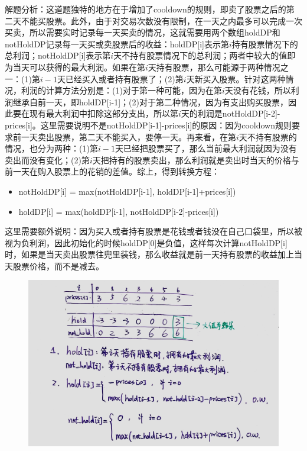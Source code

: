 \documentclass[a4paper,10pt]{article}
\begin{document}
\begin{CJK*}{UTF8}{gbsn}
\noindent 解题分析：这道题独特的地方在于增加了cooldown的规则，即卖了股票之后的第二天不能买股票。此外，由于对交易次数没有限制，在一天之内最多可以完成一次买卖，所以需要实时记录每一天买卖的情况，这就需要用两个数组holdDP和notHoldDP记录每一天买或卖股票后的收益：holdDP[i]表示第$i$持有股票情况下的总利润；notHoldDP[i]表示第$i$天不持有股票情况下的总利润；两者中较大的值即为当天可以获得的最大利润。如果在第$i$天持有股票，那么可能源于两种情况之一：(1)第$i-1$天已经买入或者持有股票了；(2)第$i$天新买入股票。针对这两种情况，利润的计算方法分别是：(1)对于第一种可能，因为在第$i$天没有花钱，所以利润继承自前一天，即holdDP[i-1]；(2)对于第二种情况，因为有支出购买股票，因此要在现有最大利润中扣除这部分支出，所以第$i$天的利润是notHoldDP[i-2]-prices[i]。这里需要说明不是notHoldDP[i-1]-prices[i]的原因：因为cooldown规则要求前一天卖出股票，第二天不能买入，要停一天。再来看，在第$i$天不持有股票的情况，也分为两种：(1)第$i-1$天已经把股票买了，那么当前最大利润就因为没有卖出而没有变化；(2)第$i$天把持有的股票卖出，那么利润就是卖出时当天的价格与前一天在购入股票上的花销的差值。综上，得到转换方程：
\begin{itemize}
    \item notHoldDP[i] = max(notHoldDP[i-1], holdDP[i-1]+prices[i])
    \item holdDP[i] = max(holdDP[i-1], notHoldDP[i-2]-prices[i])
\end{itemize}

这里需要额外说明：因为买入或者持有股票是花钱或者钱没在自己口袋里，所以被视为负利润，因此初始化的时候holdDP[0]是负值，这样每次计算notHoldDP[i]时，如果是当天卖出股票往兜里装钱，那么收益就是前一天持有股票的收益加上当天股票价格，而不是减去。
\end{CJK*}

\begin{figure}[h]
    \includegraphics[width=\textwidth]{leetcode309.jpg}
    \centering\\
\end{figure}
\end{document}
